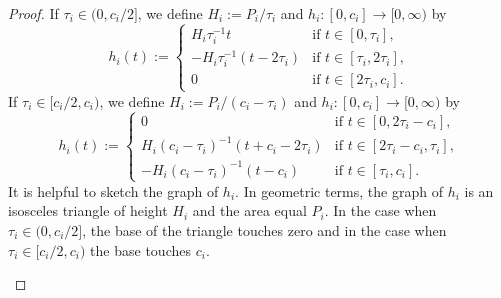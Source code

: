 \documentclass[intlimits,12pt,reqno]{amsart}
\theoremstyle{definition}
\begin{document}
\begin{proof}
If $\tau_i\in (0,c_i/2]$, we define $H_i:=P_i/\tau_i$ and $h_i:[0,c_i]\to [0,\infty)$ by
\begin{equation}
\label{eq16}
h_i(t):=
\begin{cases}
H_i\tau^{-1}_it          & \text{if } t\in [0,\tau_i],\\
-H_i\tau_i^{-1}(t-2\tau_i)     & \text{if } t\in [\tau_i,2\tau_i],\\
0                        & \text{if } t\in [2\tau_i,c_i].
\end{cases}
\end{equation}
If $\tau_i\in [c_i/2,c_i)$, we define $H_i:=P_i/(c_i-\tau_i)$ and $h_i:[0,c_i]\to [0,\infty)$ by
\begin{equation}
\label{eq17}
h_i(t):=
\begin{cases}
0                        & \text{if } t\in [0,2\tau_i-c_i],\\
H_i(c_i-\tau_i)^{-1}(t+c_i-2\tau_i)     & \text{if } t\in [2\tau_i-c_i,\tau_i],\\
-H_i(c_i-\tau_i)^{-1}(t-c_i)                        & \text{if } t\in [\tau_i,c_i].
\end{cases}
\end{equation}
It is helpful to sketch the graph of $h_i$.
In geometric terms, the graph of $h_i$ is an isosceles triangle of height $H_i$ and the area equal $P_i$. In the case when $\tau_i\in (0,c_i/2]$, the base  of the triangle touches zero and in the case when $\tau_i\in [c_i/2,c_i)$ the base touches $c_i$.
\begin{figure}[!h]
\end{figure}
\end{proof}
\end{document}
